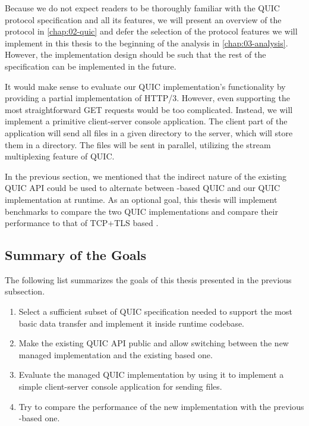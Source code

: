 Because we do not expect readers to be thoroughly familiar with the QUIC protocol specification and
all its features, we will present an overview of the protocol in \autoref{chap:02-quic} and defer
the selection of the protocol features we will implement in this thesis to the beginning of the
analysis in \autoref{chap:03-analysis}. However, the implementation design should be such that the
rest of the specification can be implemented in the future.

It would make sense to evaluate our QUIC implementation's functionality by providing a partial
implementation of HTTP/3. However, even supporting the most straightforward GET requests would be
too complicated. Instead, we will implement a primitive client-server console application. The
client part of the application will send all files in a given directory to the server, which will
store them in a directory. The files will be sent in parallel, utilizing the stream multiplexing
feature of QUIC\@.

In the previous section, we mentioned that the indirect nature of the existing QUIC API could be
used to alternate between \libmsquic{}-based QUIC and our QUIC implementation at runtime. As an
optional goal, this thesis will implement benchmarks to compare the two QUIC implementations and
compare their performance to that of TCP+TLS based .

\subsection*{Summary of the Goals}

The following list summarizes the goals of this thesis presented in the previous subsection.

\begin{enumerate}

  \item Select a sufficient subset of QUIC specification needed to support the most basic data
transfer and implement it inside \dotnet{} runtime codebase. 

  \item Make the existing QUIC API public and allow switching between the new managed implementation
and the existing \libmsquic{} based one. 

  \item Evaluate the managed QUIC implementation by using it to implement a simple client-server
console application for sending files.

  \item {} Try to compare the performance of the new
implementation with the previous \libmsquic{}-based one.

\end{enumerate}
